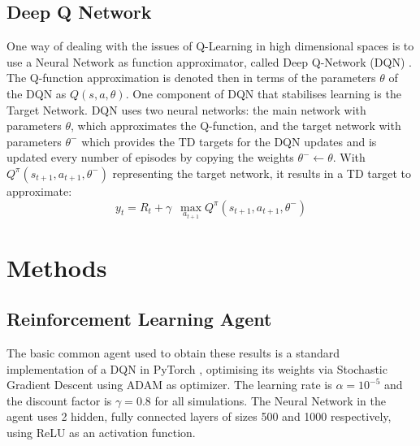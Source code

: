 \documentclass[conference]{IEEEtran}
\begin{document}
\subsection{Deep Q Network}
One way of dealing with the issues of Q-Learning in high dimensional spaces is to use a Neural Network as function approximator, called Deep Q-Network (DQN) \cite{mnih2015}.
The Q-function approximation is denoted then in terms of the parameters $\theta$ of the DQN as $Q(s,a,\theta)$.
One component of DQN that stabilises learning is the Target Network. DQN uses two neural networks: the main network with parameters $\theta$, which approximates the Q-function, and the target network with parameters $\theta^-$ which provides the TD targets for the DQN updates and is updated every number of episodes by copying the weights $\theta^- \leftarrow \theta$. With $Q^{\pi} (s_{t+1}, a_{t+1}, \theta^-)$ representing the target network, it results in a TD target to approximate:
\begin{equation}
y_t = R_t + \gamma \,\,\, \max_{a_{t+1}} Q^{\pi} (s_{t+1}, a_{t+1}, \theta^-)
\end{equation}
\section{Methods}
\label{methods}
\subsection{Reinforcement Learning Agent}
The basic common agent used to obtain these results is a standard implementation of a DQN in PyTorch \cite{pytorch}, optimising its weights via Stochastic Gradient Descent \cite{kiefer} using ADAM \cite{adam} as optimizer.
The learning rate is $\alpha=10^{-5}$ and the discount factor is $\gamma = 0.8$ for all simulations.
The Neural Network in the agent uses 2 hidden, fully connected layers of sizes 500 and 1000 respectively, using ReLU as an activation function.
\end{document}
